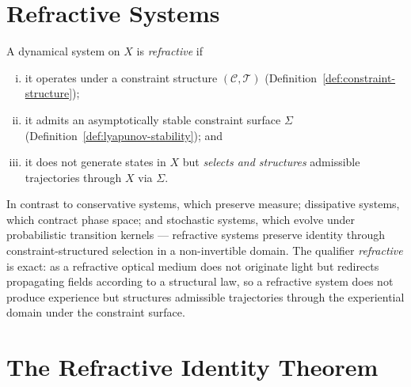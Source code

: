 \documentclass[11pt,openany]{book}
\begin{document}
\section{Refractive Systems}
\label{sec:refractive-systems}

\begin{definition}
\label{def:refractive-system}
A dynamical system on $X$ is \emph{refractive} if
\begin{enumerate}[(i)]
  \item it operates under a constraint structure
    $(\mathcal{C}, \mathcal{T})$
    (Definition~\ref{def:constraint-structure});
  \item it admits an asymptotically stable constraint surface
    $\Sigma$ (Definition~\ref{def:lyapunov-stability}); and
  \item it does not generate states in $X$ but
    \emph{selects and structures} admissible trajectories
    through $X$ via $\Sigma$.
\end{enumerate}
In contrast to conservative systems, which preserve measure;
dissipative systems, which contract phase space; and
stochastic systems, which evolve under probabilistic
transition kernels --- refractive systems preserve identity
through constraint-structured selection in a non-invertible
domain.  The qualifier \emph{refractive} is exact: as a
refractive optical medium does not originate light but
redirects propagating fields according to a structural law,
so a refractive system does not produce experience but
structures admissible trajectories through the experiential
domain under the constraint surface.
\end{definition}

\section{The Refractive Identity Theorem}
\label{sec:theorem}
\end{document}
